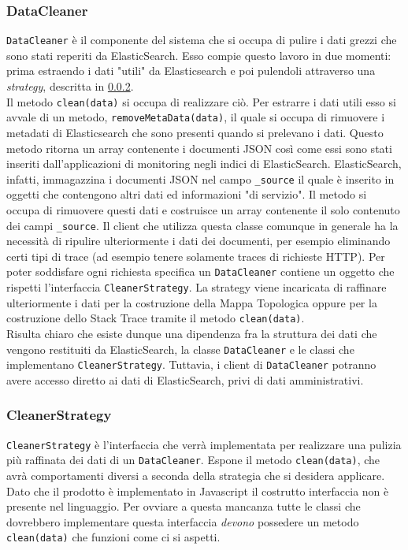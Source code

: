 \subsubsection{DataCleaner}
\label{sec:DataCleaner}
\texttt{DataCleaner} è il componente del sistema che si occupa di pulire i dati grezzi che sono stati reperiti da ElasticSearch. Esso compie questo lavoro in due momenti: prima estraendo i dati "utili" da Elasticsearch e poi pulendoli attraverso una \emph{strategy}, descritta in \ref{sec:CleanerStrategy}.\\
Il metodo \texttt{clean(data)} si occupa di realizzare ciò.
Per estrarre i dati utili esso si avvale di un metodo, \texttt{removeMetaData(data)}, il quale si occupa di rimuovere i metadati di Elasticsearch che sono presenti quando si prelevano i dati. Questo metodo ritorna un array contenente i documenti JSON così come essi sono stati inseriti dall'applicazioni di monitoring negli indici di ElasticSearch. ElasticSearch, infatti, immagazzina i documenti JSON nel campo \texttt{\_source} il quale è inserito in oggetti che contengono altri dati ed informazioni "di servizio". Il metodo si occupa di rimuovere questi dati e costruisce un array contenente il solo contenuto dei campi \texttt{\_source}. Il client che utilizza questa classe comunque in generale ha la necessità di ripulire ulteriormente i dati dei documenti, per esempio eliminando certi tipi di trace (ad esempio tenere solamente traces di richieste HTTP). Per poter soddisfare ogni richiesta specifica un \texttt{DataCleaner} contiene un oggetto che rispetti l'interfaccia \texttt{CleanerStrategy}. La strategy viene incaricata di raffinare ulteriormente i dati per la costruzione della Mappa Topologica oppure per la costruzione dello Stack Trace tramite il metodo \texttt{clean(data)}. \\
Risulta chiaro che esiste dunque una dipendenza fra la struttura dei dati che vengono restituiti da ElasticSearch, la classe \texttt{DataCleaner} e le classi che implementano \texttt{CleanerStrategy}. Tuttavia, i client di \texttt{DataCleaner} potranno avere accesso diretto ai dati di ElasticSearch, privi di dati amministrativi.

	
\subsubsection{CleanerStrategy}
\label{sec:CleanerStrategy}

\texttt{CleanerStrategy} è l'interfaccia che verrà implementata per realizzare una pulizia più raffinata dei dati di un \texttt{DataCleaner}. Espone il metodo \texttt{clean(data)}, che avrà comportamenti diversi a seconda della strategia che si desidera applicare. Dato che il prodotto è implementato in Javascript il costrutto interfaccia non è presente nel linguaggio. Per ovviare a questa mancanza tutte le classi che dovrebbero implementare questa interfaccia \emph{devono} possedere un metodo \texttt{clean(data)} che funzioni come ci si aspetti. 

